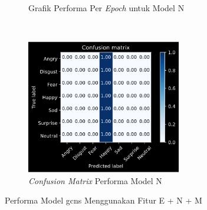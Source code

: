 \begin{figure}[t]
\begin{subfigure}[t]{6.75cm}
        \caption{Grafik Performa Per \textit{Epoch} untuk Model N}
        \label{fig:grafikeksperimen4b22}
    \end{subfigure}
    ~~~
    \begin{subfigure}[t]{6.75cm}
        \includegraphics[width=6.75cm]{gambar/eksperimen4b2_matriks2.png}
        \caption{\textit{Confusion Matrix} Performa Model N}
        \label{fig:confusionmatrixeksperimen4b22}
    \end{subfigure}
    \caption{Performa Model \acrshort{gcns} Menggunakan Fitur E + N + M}
    \label{fig:hasileksperimen4b2}
\end{figure}

